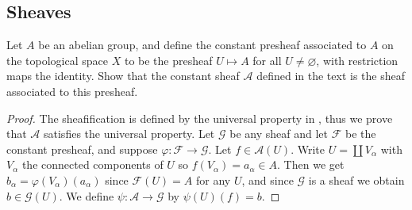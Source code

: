 \subsection{Sheaves}
\begin{exe}
	\label{2.1.1}
	Let $A$ be an abelian group, and define the constant presheaf associated to $A$ on the topological space $X$ to be the presheaf $U \mapsto A$ for all $U \neq \varnothing$, with restriction maps the identity. Show that the constant sheaf $\mathscr{A}$ defined in the text is the sheaf associated to this presheaf.
\end{exe}  
\begin{proof}
	The sheafification is defined by the universal property in \cite{HAR},  thus we prove that $\mathscr{A}$ satisfies the universal property.  Let $\mathscr{G}$ be any sheaf and let $\mathscr{F}$ be the constant presheaf, and suppose $\varphi: \mathscr{F} \rightarrow \mathscr{G}$.  Let $f \in \mathscr{A}(U)$.  Write $U=\coprod V_{\alpha}$ with $V_{\alpha}$ the connected components of $U$ so $f(V_{\alpha})=a_{\alpha} \in A .$ Then we get $b_{\alpha}=\varphi(V_{\alpha})(a_{\alpha})$ since $\mathscr{F}(U)=A$ for any $U$,  and since $\mathscr{G}$ is a sheaf we obtain $b \in \mathscr{G}(U)$.  We define $\psi: \mathscr{A} \rightarrow \mathscr{G}$ by $\psi(U)(f)=b$.
\end{proof}

